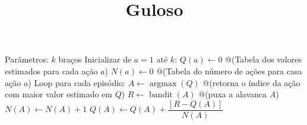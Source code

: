 \documentclass[brazilian,preview]{standalone}
\title{Guloso}
\begin{document}
\begin{algorithm}
Parâmetros: $k$ braços
Inicializar de $a=1$ até $k$:
    $Q(a) \leftarrow 0$ @\hfill@ (Tabela dos valores estimados para cada ação $a$)
    $N(a) \leftarrow 0$ @\hfill@ (Tabela do número de ações para casa ação $a$)
Loop para cada episódio:
    $A \leftarrow \operatorname{argmax}(Q)$ @\hfill@ (retorna o índice da ação com maior valor estimado em $Q$)
    $R \leftarrow \operatorname{bandit}(A)$ @\hfill@ (puxa a alavanca $A$)
    $N(A) \leftarrow N(A) + 1$
    $Q(A) \leftarrow Q(A) + \dfrac{[R - Q(A)]}{N(A)}$
\end{algorithm}
\end{document}
